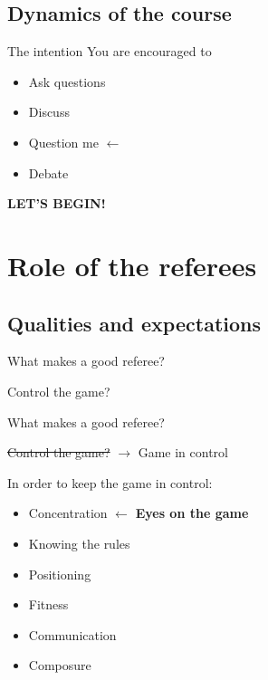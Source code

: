 \documentclass{beamer}
\begin{document}
	\subsection{Dynamics of the course}
	\begin{frame}{The intention}
		You are encouraged to
		\begin{itemize}
			\item Ask questions
			\item Discuss
			\item Question me $\leftarrow$
			\item Debate
		\end{itemize}

		\pause

		\begin{center}
			\textbf{\uppercase{Let's begin!}}
		\end{center}
	\end{frame}

	\section{Role of the referees}
	
	\subsection{Qualities and expectations}

	\begin{frame}{What makes a good referee?}
		\pause
		\begin{center}
			Control the game?
		\end{center}
	\end{frame}
		
	\begin{frame}{What makes a good referee?}
		\begin{center}
			\sout{Control the game?} $\rightarrow$ Game in control
		\end{center}
		\pause
		In order to keep the game in control:
		\begin{itemize}
			\item Concentration \pause $\leftarrow$ \textbf{Eyes on the game} \pause
			\item Knowing the rules \pause
			\item Positioning \pause
			\item Fitness \pause
			\item Communication \pause
			\item Composure
		\end{itemize}
	\end{frame}
\end{document}

